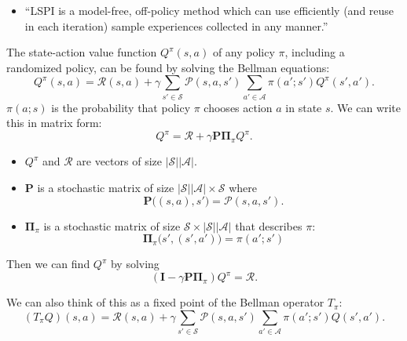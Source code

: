 \documentclass{article}
\newcommand{\abs}[1]{\left|#1\right|}
\begin{document}
\begin{itemize}
	\item ``LSPI is a model-free, off-policy method which can use efficiently (and reuse in each iteration) sample experiences collected in any manner.''
\end{itemize}

The state-action value function $Q^{\pi}(s,a)$ of any policy $\pi$, including a randomized policy, can be found by solving the Bellman equations:
\[
	Q^{\pi}(s,a)=\mathcal{R}(s,a)+\gamma\sum_{s'\in \mathcal{S}}\mathcal{P}(s,a,s')
		\sum_{a'\in \mathcal{A}}\pi(a';s')Q^{\pi}(s',a').
\]
$\pi(a;s)$ is the probability that policy $\pi$ chooses action $a$ in state $s$. We can write this in matrix form:
\[
	Q^{\pi}=\mathcal{R}+\gamma\mathbf{P}\mathbf{\Pi}_{\pi}Q^{\pi}.
\]
\begin{itemize}
	\item $Q^{\pi}$ and $\mathcal{R}$ are vectors of size $\abs{\mathcal{S}}\abs{\mathcal{A}}$.
	\item $\mathbf{P}$ is a stochastic matrix of size $\abs{\mathcal{S}}\abs{\mathcal{A}}\times \mathcal{S}$ where
		\[
			\mathbf{P}\bigl((s,a),s'\bigr)=\mathcal{P}(s,a,s').
		\]
	\item $\mathbf{\Pi}_{\pi}$ is a stochastic matrix of size $\mathcal{S}\times \abs{\mathcal{S}}\abs{\mathcal{A}}$ that describes $\pi$:
		\[
			\mathbf{\Pi}_{\pi}\bigl(s',(s',a')\bigr)=\pi(a';s')
		\]
\end{itemize}

Then we can find $Q^{\pi}$ by solving
\[
	(\mathbf{I}-\gamma \mathbf{P}\mathbf{\Pi}_{\pi})Q^{\pi}=\mathcal{R}.
\]

We can also think of this as a fixed point of the Bellman operator $T_{\pi}$:
\[
	(T_{\pi}Q)(s,a)=\mathcal{R}(s,a)+
	\gamma\sum_{s'\in \mathcal{S}}
	\mathcal{P}(s,a,s')\sum_{a'\in \mathcal{A}}
	\pi(a';s')Q(s',a').
\]
\end{document}
